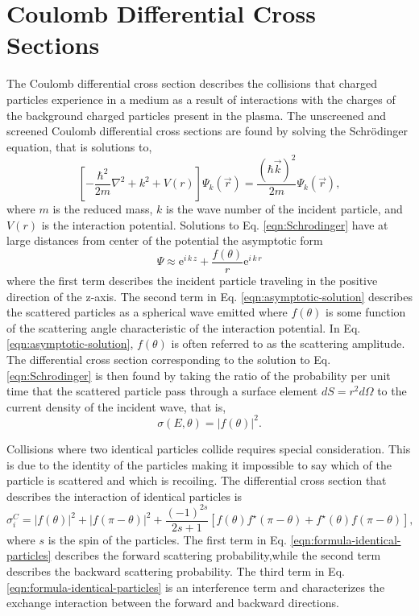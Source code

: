 \section{Coulomb Differential Cross Sections}
The Coulomb differential cross section describes the collisions that charged particles experience in a medium as a result of interactions with the charges of the background charged particles present in the plasma. The unscreened and screened Coulomb differential cross sections are found by solving the Schr\"{o}dinger equation, that is solutions to,
\begin{equation} \label{eqn:Schrodinger}
    \left[-\dfrac{\hbar^2}{2 m}\nabla^2 + k^2 + V(r)\right] \Psi_k(\vec{r}) = \dfrac{(\hbar \vec{k})^2}{2m} \Psi_k(\vec{r}),
\end{equation}
where $m$ is the reduced mass, $k$ is the wave number of the incident particle, and $V(r)$ is the interaction potential. Solutions to Eq. \eqref{eqn:Schrodinger} have at large distances from center of the potential the asymptotic form 
\begin{equation}  \label{eqn:asymptotic-solution}
    \Psi \approx \text{e}^{i\,k\,z} + \dfrac{f(\theta)}{r}\text{e}^{i\,k\,r}
\end{equation}
where the first term describes the incident particle traveling in the positive direction of the z-axis. The second term in Eq. \eqref{eqn:asymptotic-solution} describes the scattered particles as a spherical wave emitted where $f(\theta)$ is some function of the scattering angle characteristic of the interaction potential. In Eq. \eqref{eqn:asymptotic-solution}, $f(\theta)$ is often referred to as the scattering amplitude. The differential cross section corresponding to the solution to Eq. \eqref{eqn:Schrodinger} is then found by taking the ratio of the probability per unit time that the scattered particle pass through a surface element $dS = r^2 d\Omega$ to the current density of the incident wave, that is,
\begin{equation} \label{eqn:formula-distinguishable-particles}
    \sigma(E,\theta) = |f(\theta)|^2.
\end{equation}

Collisions where two identical particles collide requires special consideration. This is due to the identity of the particles making it impossible to say which of the particle is scattered and which is recoiling. The differential cross section that describes the interaction of identical particles is
\begin{equation} \label{eqn:formula-identical-particles}
    \sigma_{i}^{C} = | f(\theta) |^2 + | f(\pi - \theta) |^2 + \dfrac{(-1)^{2s}}{2s+1} \left[ f(\theta) f^{\star}(\pi-\theta) + f^{\star}(\theta) f(\pi-\theta) \right],
\end{equation}
where $s$ is the spin of the particles. The first term in Eq. \eqref{eqn:formula-identical-particles} describes the forward scattering probability,while the second term describes the backward scattering probability. The third term in Eq. \eqref{eqn:formula-identical-particles} is an interference term and characterizes the exchange interaction between the forward and backward directions.

